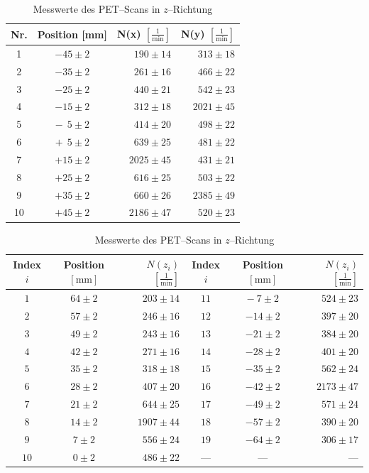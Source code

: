 \documentclass[12pt,a4paper]{scrartcl}
\numberwithin{equation}{section} %
\begin{document}
\begin{table}
	\centering
	\begin{tabular}[h]{c|c|r|r}
		Nr. & Position [mm] & N(x) $[\frac{1}{\mathrm{min}}]$ & N(y) $[\frac{1}{\mathrm{min}}]$ \vspace{1pt}\\
		\hline
		1 & $-45 \pm 2$ & $190 \pm 14$ & $313 \pm 18$ \\
		2 & $-35 \pm 2$ & $261 \pm 16$ & $466 \pm 22$ \\
		3 & $-25 \pm 2$ & $440 \pm 21$ & $542 \pm 23$ \\
		4 & $-15 \pm 2$ & $312 \pm 18$ & $2021 \pm 45$ \\
		5 & $-\ \ 5 \pm 2$ & $414 \pm 20$ & $498 \pm 22$ \\
		6 & $+\ \ 5 \pm 2$ & $639 \pm 25$ & $481 \pm 22$ \\
		7 & $+15 \pm 2$ & $2025 \pm 45$ & $431 \pm 21$ \\
		8 & $+25 \pm 2$ & $616 \pm 25$ & $503 \pm 22$ \\
		9 & $+35 \pm 2$ & $660 \pm 26$ & $2385 \pm 49$ \\
		10 & $+45 \pm 2$ & $2186 \pm 47$ & $520 \pm 23$
	\end{tabular}
	\caption{Messwerte des PET--Scans in $x$-- und $y$--Richtung}
	\label{tab:PET x y}
	
	\vspace{24pt}
	\begin{tabular}{c|c|r||c|c|r}
		Index $i$ &
			Position $[\mathrm{mm}]$ &
			$N(z_i)$ $[\frac{1}{\mathrm{min}}]$&
			Index $i$ &
			Position $[\mathrm{mm}]$ &
			$N(z_i)$ $[\frac{1}{\mathrm{min}}]$ \vspace{1pt}\\
		\hline
		$1$ & $64 \pm 2$ & $203 \pm 14$&
		$11$ & $-\ 7 \pm 2$ & $524 \pm 23$ \\
		$2$ & $57 \pm 2$ & $246\pm 16$&
		$12$ & $-14 \pm 2$ & $397 \pm 20$ \\
		$3$ & $49 \pm 2$ & $243\pm 16$ &
		$13$ & $-21 \pm 2$ & $384 \pm 20$ \\
		$4$ & $42 \pm 2$ & $271 \pm 16$ &
		$14$ & $-28 \pm 2$ & $401 \pm 20$ \\
		$5$ & $35 \pm 2$ & $318 \pm 18$ &
		$15$ & $-35 \pm 2$ & $562 \pm 24$ \\
		$6$ & $28 \pm 2$ & $407 \pm 20$ &
		$16$ & $-42 \pm 2$ & $2173 \pm 47$ \\
		$7$ & $21 \pm 2$ & $644 \pm 25$ &
		$17$ & $-49 \pm 2$ & $571 \pm 24$ \\
		$8$ & $14 \pm 2$ & $1907 \pm 44$ &
		$18$ & $-57 \pm 2$ & $390 \pm 20$ \\
		$9$ & $7 \pm 2$ & $556 \pm 24$ &
		$19$ & $-64 \pm 2$ & $306 \pm 17$ \\
		$10$ & $0 \pm 2$ & $486 \pm 22$ &---&---&---\hspace{8mm}
	\end{tabular}
	\caption{Messwerte des PET--Scans in $z$--Richtung}
	\label{tab:PET z}


\end{table}
\end{document}
